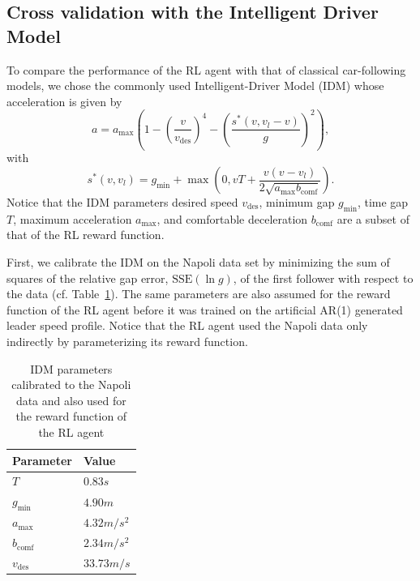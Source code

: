 \documentclass[review]{elsarticle}
\providecommand{\sub}[1]{_{\mathrm{#1}}}  %
\providecommand{\3}{{\ss}}
\begin{document}
\subsection{Cross validation with the Intelligent Driver Model}
To compare the performance of the RL agent with that of
classical car-following models, we chose the commonly used
Intelligent-Driver Model (IDM)\cite{Opus} whose acceleration is given
by 
\begin{equation}
\label{eq:IDM}
a=a\sub{max}\left(1-\left(\frac{v}{v\sub{des}}\right)^{4}-\left(\frac{s^{*}\left(v, v_l-v\right)}{g}\right)^{2}\right),
\end{equation}
with
\begin{equation}
\label{eq:IDMsstar}
s^{*}\left(v, v_l\right)=g\sub{min}+\max \left(0,vT+\frac{v(v-v_l)}{2 \sqrt{a\sub{max} b\sub{comf}}}\right).
\end{equation}
Notice that the IDM parameters desired
speed $v\sub{des}$, minimum gap $g\sub{min}$, time gap $T$, maximum
acceleration $a\sub{max}$, and
comfortable deceleration $b\sub{comf}$ are a subset of that of the RL reward
function. 

First, we calibrate the IDM on the Napoli data set by
minimizing the sum of squares of the relative gap error,
$\mathrm{SSE}(\ln g)$, of the first follower with respect to the
data (cf. Table~\ref{tab:IDMparameters}). The same parameters are also
assumed for the reward function of the RL agent before it was trained
on the artificial AR(1) generated leader speed profile. Notice that the RL agent used the Napoli data only
indirectly by parameterizing its reward function.

\begin{table}
	\caption{IDM parameters calibrated to the Napoli
            data and also used for the reward function of the RL agent}
	\label{tab:IDMparameters} 
	\begin{center}
		\begin{tabular}{ p{} |p{}  } 
		Parameter & Value   \\ \hline
			$T$ & $0.83s$\\
			$g\sub{min}$ & $4.90m$\\
			$a\sub{max}$ & $4.32m/s^2$\\
			$b\sub{comf}$ & $2.34 m/s^2$\\
			$v\sub{des}$ & $33.73m/s$
			
		\end{tabular}
	\end{center}
\end{table}
\end{document}
